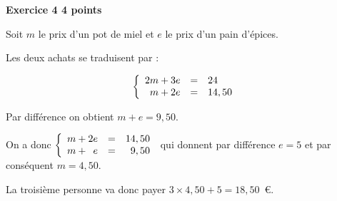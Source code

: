 \textbf{Exercice 4 \hfill 4 points}

\medskip

%
%
%
%
%
Soit $m$ le prix d'un pot de miel et $e$ le prix d'un pain d'épices.

Les deux achats se traduisent par :

\[\left\{\begin{array}{l c l}
2m + 3e&=&24\\
\phantom{2}m + 2e&=&14,50
\end{array}\right.\]

Par différence on obtient $m + e = 9,50$.

On a donc $\left\{\begin{array}{l c r}
m + 2e&=&14,50\\
m + \phantom{2}e &=& 9,50
\end{array}\right.$ qui donnent par différence $e = 5$ et par conséquent $m = 4,50$.

La troisième personne va donc payer $3 \times 4,50 + 5 = 18,50$~\euro.
\vspace{0.5cm}

